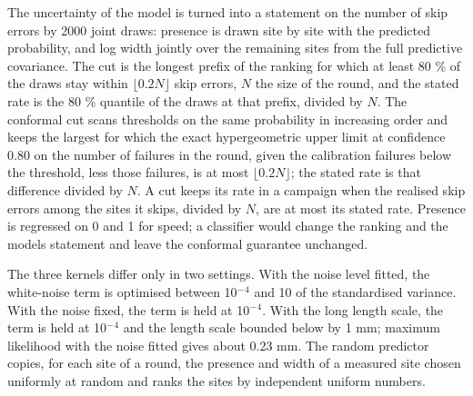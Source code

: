 \documentclass{iopjournal}
\begin{document}
The uncertainty of the model is turned into a statement on the number of skip errors by 2000 joint draws: presence is drawn site by site with the predicted probability, and log width jointly over the remaining sites from the full predictive covariance. The cut is the longest prefix of the ranking for which at least 80 \% of the draws stay within \(\lfloor 0.2 N \rfloor\) skip errors, \(N\) the size of the round, and the stated rate is the 80 \% quantile of the draws at that prefix, divided by \(N\). The conformal cut scans thresholds on the same probability in increasing order and keeps the largest for which the exact hypergeometric upper limit at confidence 0.80 on the number of failures in the round, given the calibration failures below the threshold, less those failures, is at most \(\lfloor 0.2 N \rfloor\); the stated rate is that difference divided by \(N\). A cut keeps its rate in a campaign when the realised skip errors among the sites it skips, divided by \(N\), are at most its stated rate. Presence is regressed on 0 and 1 for speed; a classifier would change the ranking and the model\textquotesingle s statement and leave the conformal guarantee unchanged.

The three kernels differ only in two settings. With the noise level fitted, the white-noise term is optimised between 10\ensuremath{^{-}}\ensuremath{^{4}} and 10 of the standardised variance. With the noise fixed, the term is held at 10\ensuremath{^{-}}\ensuremath{^{4}}. With the long length scale, the term is held at 10\ensuremath{^{-}}\ensuremath{^{4}} and the length scale bounded below by 1 mm; maximum likelihood with the noise fitted gives about 0.23 mm. The random predictor copies, for each site of a round, the presence and width of a measured site chosen uniformly at random and ranks the sites by independent uniform numbers.
\end{document}
